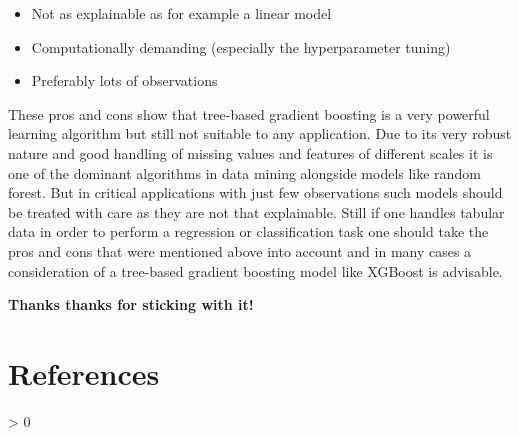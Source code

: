 \documentclass[
]{book}
\newlength{\cslhangindent}
\newenvironment{CSLReferences}[2] %
 {%
  \setlength{\parindent}{0pt}
  \ifodd #1 \everypar{\setlength{\hangindent}{\cslhangindent}}\ignorespaces\fi
  \ifnum #2 > 0
  \setlength{\parskip}{#2\baselineskip}
  \fi
 }%
 {}
\begin{document}
\begin{itemize}
\item
  Not as explainable as for example a linear model
\item
  Computationally demanding (especially the hyperparameter tuning)
\item
  Preferably lots of observations
\end{itemize}

These pros and cons show that tree-based gradient boosting is a very powerful learning algorithm but still not suitable to any application. Due to its very robust nature and good handling of missing values and features of different scales it is one of the dominant algorithms in data mining alongside models like random forest. But in critical applications with just few observations such models should be treated with care as they are not that explainable. Still if one handles tabular data in order to perform a regression or classification task one should take the pros and cons that were mentioned above into account and in many cases a consideration of a tree-based gradient boosting model like XGBoost is advisable.

\textbf{Thanks thanks for sticking with it!}

\hypertarget{references}{%
\chapter{References}\label{references}}

\hypertarget{refs}{}
\begin{CSLReferences}{0}{0}
\end{CSLReferences}

  
\end{document}
